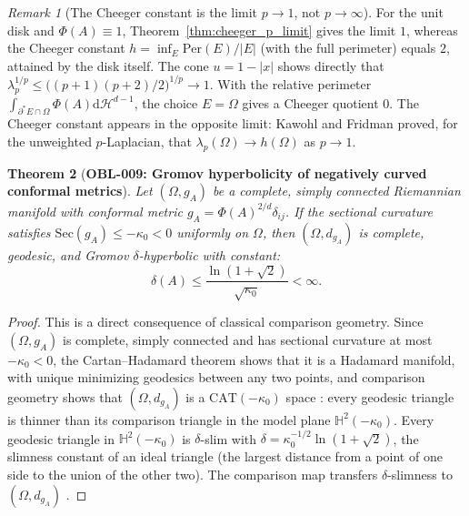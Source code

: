 \documentclass[11pt,a4paper,reqno]{amsart}
\newtheorem{theorem}{Theorem}[section]
\theoremstyle{definition}
\theoremstyle{remark}
\newtheorem{remark}[theorem]{Remark}
\numberwithin{equation}{section}
\newcommand{\dif}{\mathrm{d}}
\begin{document}
\begin{remark}[The Cheeger constant is the limit $p \to 1$, not $p \to \infty$]
\label{rem:cheeger}
For the unit disk and $\Phi(A) \equiv 1$, Theorem~\ref{thm:cheeger_p_limit} gives the limit $1$, whereas the Cheeger constant \cite{Cheeger1970} $h = \inf_E \mathrm{Per}(E)/|E|$ (with the full perimeter) equals $2$, attained by the disk itself. The cone $u = 1 - |x|$ shows directly that $\lambda_p^{1/p} \le \big((p+1)(p+2)/2\big)^{1/p} \to 1$. With the relative perimeter $\int_{\partial^*E \cap \Omega}\Phi(A)\dif\mathcal{H}^{d-1}$, the choice $E = \Omega$ gives a Cheeger quotient $0$. The Cheeger constant appears in the opposite limit: Kawohl and Fridman \cite{KawohlFridman2003} proved, for the unweighted $p$-Laplacian, that $\lambda_p(\Omega) \to h(\Omega)$ as $p \to 1$.
\end{remark}

\begin{theorem}[\textbf{OBL-009: Gromov hyperbolicity of negatively curved conformal metrics}]
\label{thm:gromov_hyperbolicity}
Let $(\Omega, g_A)$ be a complete, simply connected Riemannian manifold with conformal metric $g_A = \Phi(A)^{2/d} \delta_{ij}$. If the sectional curvature satisfies $\mathrm{Sec}(g_A) \le -\kappa_0 < 0$ uniformly on $\Omega$, then $(\Omega, d_{g_A})$ is complete, geodesic, and Gromov $\delta$-hyperbolic with constant:
\begin{equation}
\delta(A) \le \frac{\ln(1 + \sqrt{2})}{\sqrt{\kappa_0}} < \infty.
\end{equation}
\end{theorem}

\begin{proof}
This is a direct consequence of classical comparison geometry. Since $(\Omega, g_A)$ is complete, simply connected and has sectional curvature at most $-\kappa_0 < 0$, the Cartan--Hadamard theorem shows that it is a Hadamard manifold, with unique minimizing geodesics between any two points, and comparison geometry shows that $(\Omega, d_{g_A})$ is a $\mathrm{CAT}(-\kappa_0)$ space \cite{BridsonHaefliger1999}: every geodesic triangle is thinner than its comparison triangle in the model plane $\mathbb{H}^2(-\kappa_0)$. Every geodesic triangle in $\mathbb{H}^2(-\kappa_0)$ is $\delta$-slim with $\delta = \kappa_0^{-1/2}\ln(1+\sqrt2)$, the slimness constant of an ideal triangle (the largest distance from a point of one side to the union of the other two). The comparison map transfers $\delta$-slimness to $(\Omega, d_{g_A})$ \cite{BridsonHaefliger1999,Gromov1987}.
\end{proof}
\end{document}
